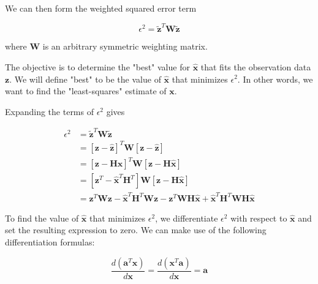 \documentclass[12pt]{article}
\begin{document}
We can then form the weighted squared error term

\begin{equation*}
    \epsilon^2 = \tilde{\mathbf{z}}^T \mathbf{W} \tilde{\mathbf{z}}
\end{equation*}

where $\mathbf{W}$ is an arbitrary symmetric weighting matrix.

The objective is to determine the "best" value for $\hat{\mathbf{x}}$ that fits the
observation data $\mathbf{z}$. We will define "best" to be the value of $\hat{\mathbf{x}}$
that minimizes $\epsilon^2$. In other words, we want to find the "least-squares"
estimate of $\mathbf{x}$.

Expanding the terms of $\epsilon^2$ gives

\begin{equation*}
    \begin{aligned}
        \epsilon^2 &= \tilde{\mathbf{z}}^T \mathbf{W} \tilde{\mathbf{z}} \\
                   &= \left[ \mathbf{z} - \hat{\mathbf{z}} \right]^T \mathbf{W} \left[ \mathbf{z} - \hat{\mathbf{z}} \right] \\
                   &= \left[ \mathbf{z} - \mathbf{H} \hat{\mathbf{x}} \right]^T \mathbf{W} \left[ \mathbf{z} - \mathbf{H} \hat{\mathbf{x}} \right] \\
                   &= \left[ \mathbf{z}^T - \hat{\mathbf{x}}^T \mathbf{H}^T \right] \mathbf{W} \left[ \mathbf{z} - \mathbf{H} \hat{\mathbf{x}} \right] \\
                   &= \mathbf{z}^T \mathbf{W} \mathbf{z} - \hat{\mathbf{x}}^T \mathbf{H}^T \mathbf{W} \mathbf{z}
                      - \mathbf{z}^T \mathbf{W} \mathbf{H} \hat{\mathbf{x}} + \hat{\mathbf{x}}^T \mathbf{H}^T \mathbf{W} \mathbf{H} \hat{\mathbf{x}}
    \end{aligned}
\end{equation*}

To find the value of $\hat{\mathbf{x}}$ that minimizes $\epsilon^2$, we differentiate 
$\epsilon^2$ with respect to $\hat{\mathbf{x}}$ and set the resulting expression to zero.
We can make use of the following differentiation formulas:

\begin{equation*}
    \frac{ d \left( \mathbf{a}^T \mathbf{x} \right) }{d \mathbf{x}} = \frac{ d \left( \mathbf{x}^T \mathbf{a} \right) }{d \mathbf{x}} = \mathbf{a}
\end{equation*}
\end{document}
